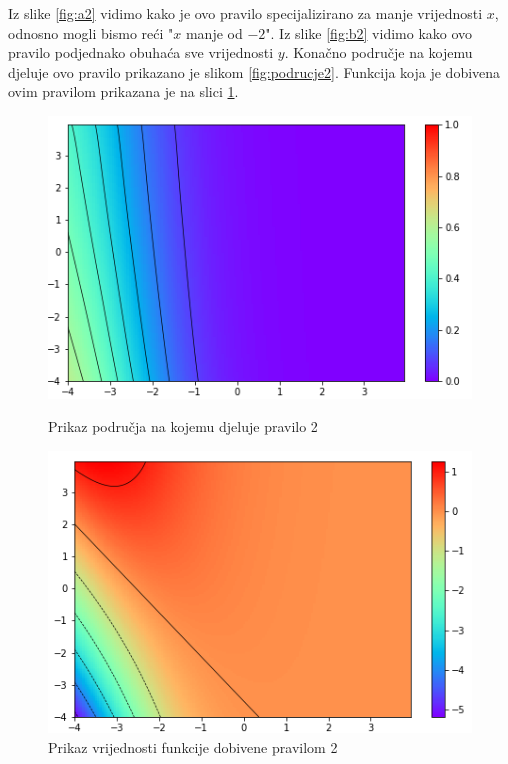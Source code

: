 \documentclass[12pt, a4paper, numeric]{article}
\begin{document}
Iz slike \ref{fig:a2} vidimo kako je ovo pravilo specijalizirano za manje vrijednosti $x$, odnosno mogli bismo reći "$x$ manje od $-2$".
Iz slike \ref{fig:b2} vidimo kako ovo pravilo podjednako obuhaća sve vrijednosti $y$.
Konačno područje na kojemu djeluje ovo pravilo prikazano je slikom \ref{fig:podrucje2}.
Funkcija koja je dobivena ovim pravilom prikazana je na slici \ref{fig:rule2}.
\begin{figure}[!ht]
    \centering
    \begin{minipage}{.5\textwidth}
        \centering
        \includegraphics[width=.9\linewidth]{img/ruleArea2}
        \captionsetup{justification=centering}
        \caption{Prikaz područja na kojemu djeluje pravilo 2}
        \label{fig:podrucje2}
    \end{minipage}%
    \begin{minipage}{.5\textwidth}
        \centering
        \includegraphics[width=.9\linewidth]{img/rule2}
        \captionsetup{justification=centering}
        \caption{Prikaz vrijednosti funkcije dobivene pravilom 2}
        \label{fig:rule2}
    \end{minipage}
\end{figure}
\end{document}
